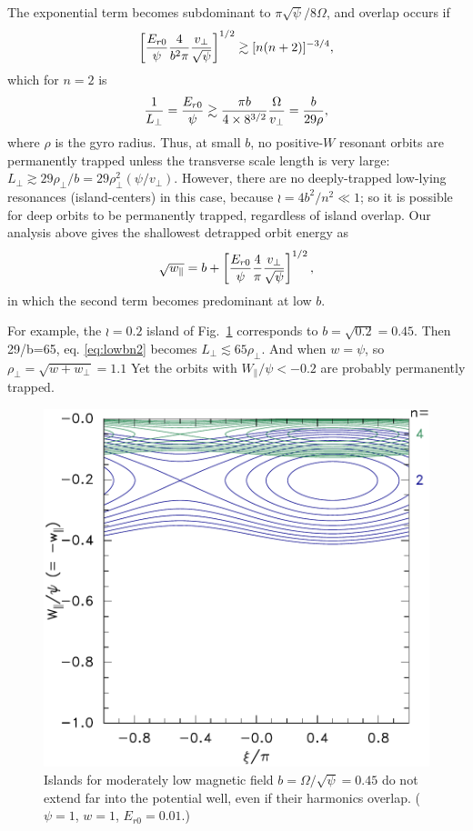 

The exponential term becomes subdominant to
$\pi\sqrt{\psi}/8\Omega$, and overlap occurs if
\begin{equation}
  \label{eq:touchlow}
   \left[  {E_{r0}\over\psi}
     {4\over b^2\pi}
    {v_\perp\over\sqrt\psi}\right]^{1/2}
  \gtrsim  [n(n+2)]^{-3/4},
\end{equation}
which for $n=2$ is
\begin{equation}
  \label{eq:lowbn2}
 {1\over L_\perp}={E_{r0}\over\psi} \gtrsim 
    {\pi b\over 4\times8^{3/2}}  
    {\Omega\over v_\perp}
    ={b\over 29\rho},
\end{equation}
where $\rho$ is the gyro radius. Thus, at small $b$, no
positive-$W$ resonant orbits are permanently trapped unless the
transverse scale length is very large:
$L_\perp \gtrsim 29 \rho_\perp/b= 29\rho_\perp^2 (\psi/v_\perp)$.
However, there are no deeply-trapped low-lying resonances
(island-centers) in this case, because $\wr=4b^2/n^2\ll 1$; so it is
possible for deep orbits to be permanently trapped, regardless of
island overlap. Our analysis above gives the shallowest detrapped
orbit energy as 
\begin{equation}
  \label{eq:lowb}
  \sqrt{\wp}=%
  b+
   \left[  {E_{r0}\over\psi}
     {4\over \pi}
    {v_\perp\over\sqrt\psi}\right]^{1/2},
\end{equation}
in which the second term becomes predominant at low $b$.


For example, the $\wr=0.2$ island of Fig.\ 
\ref{fig:lowbislands} corresponds to $b=\sqrt{0.2}=0.45$. Then 29/b=65,
eq. \ref{eq:lowbn2} becomes $L_\perp\lesssim 65\rho_\perp$. And when
$w=\psi$, so $\rho_\perp=\sqrt{w+w_\perp}=1.1$ Yet the orbits
with $W_\parallel/\psi<-0.2$ are probably permanently trapped.
\begin{figure}[htp]
  \centering
  \includegraphics[width=0.5\hsize]{lowbislands}
  \caption{Islands for moderately low magnetic field
    $b=\Omega/\sqrt{\psi}=0.45$ do not extend far into the potential
    well, even if their harmonics overlap. ($\psi=1$, $w=1$, $E_{r0}=0.01$.)}
  \label{fig:lowbislands}
\end{figure}


